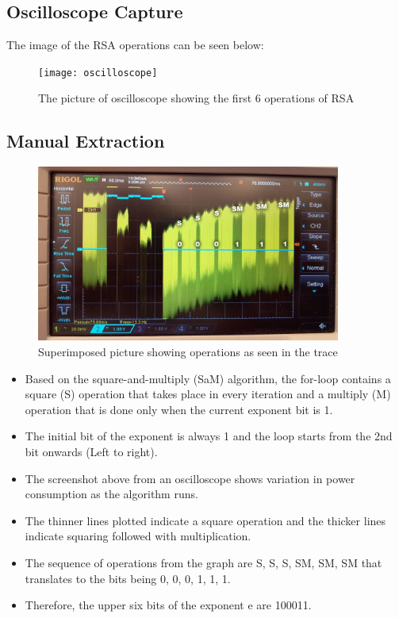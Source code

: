 \documentclass[1p,16pt]{elsarticle}
\begin{document}
\subsection{Oscilloscope Capture}%
\label{sub:oscilloscope_capture}
The image of the RSA operations can be seen below:
\begin{figure}[H]
	\centering
    \centerline{\texttt{[image: oscilloscope]}}
    \caption{The picture of oscilloscope showing the first 6 operations of RSA}\label{fig:oscilloscope}
\end{figure}

\subsection{Manual Extraction}%
\label{sub:manual_extraction}

\begin{figure}[H]
	\centering
    \centerline{\includegraphics[width=10cm]{manual_extraction}}
    \caption{Superimposed picture showing operations as seen in the trace}\label{fig:manual_extraction}
\end{figure}
\begin{itemize}

\item Based on the square-and-multiply (SaM) algorithm, the for-loop contains a square (S) operation that takes place in every iteration and a multiply (M) operation that is done only when the current exponent bit is 1.

\item The initial bit of the exponent is always 1 and the loop starts from the 2nd bit onwards (Left to right).

\item The screenshot above from an oscilloscope shows variation in power consumption as the algorithm runs.

\item The thinner lines plotted indicate a square operation and the thicker lines indicate squaring followed with multiplication.

\item The sequence of operations from the graph are S, S, S, SM, SM, SM that translates to the bits being 0, 0, 0, 1, 1, 1.

\item Therefore, the upper six bits of the exponent e are 100011.

\end{itemize}
\end{document}
